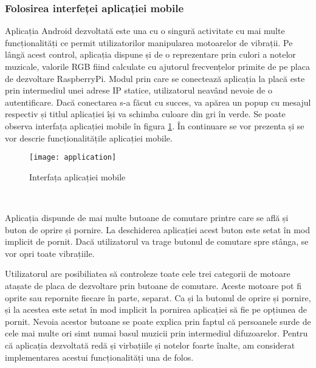 \documentclass[../IoMusT.tex]{subfiles}
\begin{document}
\subsubsection{Folosirea interfeței aplicației mobile}
Aplicația Android dezvoltată este una cu o singură activitate cu mai multe funcționalități ce permit utilizatorilor manipularea motoarelor de vibrații.
 Pe lângă acest control, aplicația dispune și de o reprezentare prin culori a notelor muzicale, valorile RGB fiind calculate cu ajutorul frecvențelor primite de pe placa de dezvoltare RaspberryPi. Modul prin care se conectează aplicația la placă este prin intermediul unei adrese IP statice, utilizatorul neavând nevoie de o autentificare. Dacă conectarea s-a făcut cu succes, va apărea un popup cu mesajul respectiv și titlul aplicației își va schimba culoare din gri în verde. Se poate observa interfața aplicației mobile în figura \ref{fig:application}. În continuare se vor prezenta și se vor descrie funcționalitățile aplicației mobile.
\begin{figure}[h]
\begin{center}
\texttt{[image: application]}
\caption{Interfața aplicației mobile}
\label{fig:application}
\end{center}
\end{figure}
\\
\par Aplicația dispunde de mai multe butoane de comutare printre care se află și buton de oprire și pornire. La deschiderea aplicației acest buton este setat în mod implicit de pornit. Dacă utilizatorul va trage butonul de comutare spre stânga, se vor opri toate vibrațiile.
\\ %
\par Utilizatorul are posibiliatea să controleze toate cele trei categorii de motoare atașate de placa de dezvoltare prin butoane de comutare. Aceste motoare pot fi oprite sau repornite fiecare în parte, separat. Ca și la butonul de oprire și pornire, și la acestea este setat în mod implicit la pornirea aplicației să fie pe opțiunea de pornit. Nevoia acestor butoane se poate explica prin faptul că persoanele surde de cele mai multe ori simt numai basul muzicii prin intermediul difuzoarelor. Pentru că aplicația dezvoltată redă și virbațiile și notelor foarte înalte, am considerat implementarea acestui funcționalități una de folos. 
\end{document}
